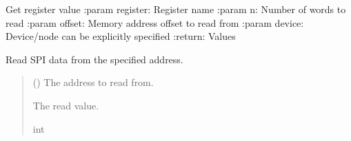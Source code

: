 \documentclass[letterpaper,10pt,english]{sphinxmanual}
\begin{document}
\begin{fulllineitems}
\begin{fulllineitems}
\end{fulllineitems}


\begin{fulllineitems}
\label{\detokenize{apidocs:management.MANAGEMENT.read_register}}
\pysigstartsignatures
{}
\pysigstopsignatures
\sphinxAtStartPar
Get register value
:param register: Register name
:param n: Number of words to read
:param offset: Memory address offset to read from
:param device: Device/node can be explicitly specified
:return: Values

\end{fulllineitems}


\begin{fulllineitems}
\label{\detokenize{apidocs:management.MANAGEMENT.read_spi}}
\pysigstartsignatures
{}
\pysigstopsignatures
\sphinxAtStartPar
Read SPI data from the specified address.
\begin{quote}\begin{description}
\sphinxAtStartPar
{} () \textendash{} The address to read from.

\sphinxAtStartPar
The read value.

\sphinxAtStartPar
int

\end{description}\end{quote}

\end{fulllineitems}



\end{fulllineitems}
\end{document}
